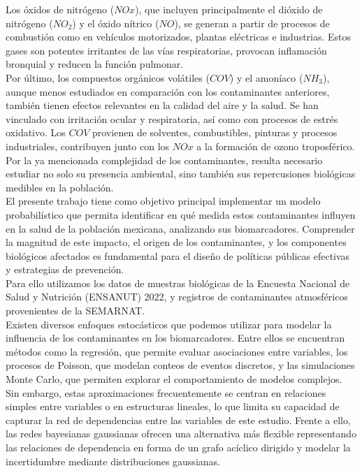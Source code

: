 \documentclass[12pt, letterpaper]{report}
\begin{document}
Los óxidos de nitrógeno ($NOx$), que incluyen principalmente el dióxido de nitrógeno ($NO_2$) y el óxido nítrico ($NO$), se generan a partir de procesos de combustión como en vehículos motorizados, plantas eléctricas e industrias. Estos gases son potentes irritantes de las vías respiratorias, provocan inflamación bronquial y reducen la función pulmonar. \cite{atsdr2016}
\\

Por último, los compuestos orgánicos volátiles ($COV$) y el amoníaco ($NH_3$), aunque menos estudiados en comparación con los contaminantes anteriores, también tienen efectos relevantes en la calidad del aire y la salud. Se han vinculado con irritación ocular y respiratoria, así como con procesos de estrés oxidativo. \cite{atsdr2026} Los $COV$ provienen de solventes, combustibles, pinturas y procesos industriales, contribuyen junto con los $NOx$ a la formación de ozono troposférico. \cite{epa2025}
\\

Por la ya mencionada complejidad de los contaminantes, resulta necesario estudiar no solo su presencia ambiental, sino también sus repercusiones biológicas medibles en la población.
\\

El presente trabajo tiene como objetivo principal implementar un modelo probabilístico que permita identificar en qué medida estos contaminantes influyen en la salud de la población mexicana, analizando sus biomarcadores. Comprender la magnitud de este impacto, el origen de los contaminantes, y los componentes biológicos afectados es fundamental para el diseño de políticas públicas efectivas y estrategias de prevención.
\\

Para ello utilizamos los datos de muestras biológicas de la Encuesta Nacional de Salud y Nutrición (ENSANUT) 2022, y registros de contaminantes atmosféricos provenientes de la SEMARNAT.
\\

Existen diversos enfoques estocásticos que podemos utilizar para modelar la influencia de los contaminantes en los biomarcadores. Entre ellos se encuentran métodos como la regresión, que permite evaluar asociaciones entre variables, los procesos de Poisson, que modelan conteos de eventos discretos, y las simulaciones Monte Carlo, que permiten explorar el comportamiento de modelos complejos. Sin embargo, estas aproximaciones frecuentemente se centran en relaciones simples entre variables o en estructuras lineales, lo que limita su capacidad de capturar la red de dependencias entre las variables de este estudio. Frente a ello, las redes bayesianas gaussianas ofrecen una alternativa más flexible representando las relaciones de dependencia en forma de un grafo acíclico dirigido y modelar la incertidumbre mediante distribuciones gaussianas.
\end{document}
